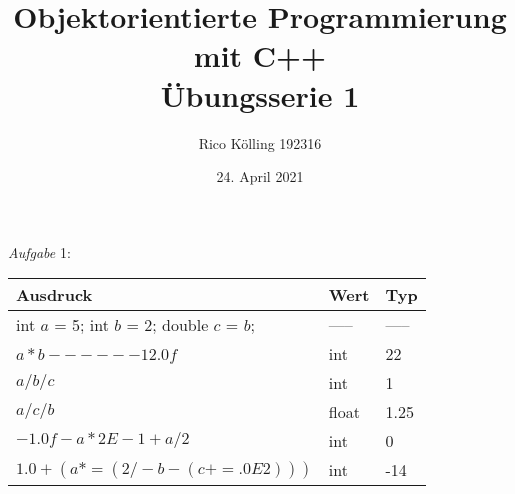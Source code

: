 \documentclass[12pt]{article}
\title{Objektorientierte Programmierung mit C++ \\ Übungsserie 1}
\author{Rico Kölling 192316}
\date{24. April 2021}
\begin{document}
\maketitle
\textit{Aufgabe} 1: \\ [16pt]
	\begin{tabular}{l|l|l|}

		Ausdruck & Wert & Typ\\ \hline
		int $a$ = 5; int $b$ = 2; double $c$ = $b$; & ----- & ----- \\ 		\hline
		$a * b - - - - - - 12.0f$ & int & 22 \\ \hline
		$a / b / c $ & int & 1 \\ \hline
		$a / c / b $ & float & 1.25 \\ \hline
		$-1.0f - a*2 E -1 + a/ 2$ & int & 0 \\ \hline
		$1.0 + (a *= ( 2 / - b -(c += .0E2)))$ & int & -14 \\ \hline

	\end{tabular}
	
\end{document}
